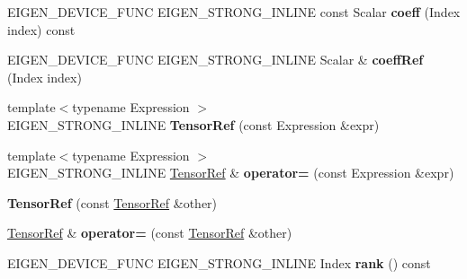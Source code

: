 \begin{DoxyCompactItemize}
\mbox{\label{class_eigen_1_1_tensor_ref_a01da66613cf2600923a71da55a0f3d32}} 
E\+I\+G\+E\+N\+\_\+\+D\+E\+V\+I\+C\+E\+\_\+\+F\+U\+NC E\+I\+G\+E\+N\+\_\+\+S\+T\+R\+O\+N\+G\+\_\+\+I\+N\+L\+I\+NE const Scalar {\bfseries coeff} (Index index) const
\item 
\mbox{\label{class_eigen_1_1_tensor_ref_a326315b6b6d2f3a04ab756b6443f6325}} 
E\+I\+G\+E\+N\+\_\+\+D\+E\+V\+I\+C\+E\+\_\+\+F\+U\+NC E\+I\+G\+E\+N\+\_\+\+S\+T\+R\+O\+N\+G\+\_\+\+I\+N\+L\+I\+NE Scalar \& {\bfseries coeff\+Ref} (Index index)
\item 
\mbox{\label{class_eigen_1_1_tensor_ref_ac14e6162b16cabfd5768e7656d90f805}} 
{\footnotesize template$<$typename Expression $>$ }\\E\+I\+G\+E\+N\+\_\+\+S\+T\+R\+O\+N\+G\+\_\+\+I\+N\+L\+I\+NE {\bfseries Tensor\+Ref} (const Expression \&expr)
\item 
\mbox{\label{class_eigen_1_1_tensor_ref_a3c9b742ec8e3174f749bbb3496ce3567}} 
{\footnotesize template$<$typename Expression $>$ }\\E\+I\+G\+E\+N\+\_\+\+S\+T\+R\+O\+N\+G\+\_\+\+I\+N\+L\+I\+NE \hyperlink{class_eigen_1_1_tensor_ref}{Tensor\+Ref} \& {\bfseries operator=} (const Expression \&expr)
\item 
\mbox{\label{class_eigen_1_1_tensor_ref_a16fc8bd7d36fe78299a14a27f5e5a9ce}} 
{\bfseries Tensor\+Ref} (const \hyperlink{class_eigen_1_1_tensor_ref}{Tensor\+Ref} \&other)
\item 
\mbox{\label{class_eigen_1_1_tensor_ref_a1e1e3403fa4245a05fff49cb58ba40fd}} 
\hyperlink{class_eigen_1_1_tensor_ref}{Tensor\+Ref} \& {\bfseries operator=} (const \hyperlink{class_eigen_1_1_tensor_ref}{Tensor\+Ref} \&other)
\item 
\mbox{\label{class_eigen_1_1_tensor_ref_a6ea330668a912404f71565c87896524c}} 
E\+I\+G\+E\+N\+\_\+\+D\+E\+V\+I\+C\+E\+\_\+\+F\+U\+NC E\+I\+G\+E\+N\+\_\+\+S\+T\+R\+O\+N\+G\+\_\+\+I\+N\+L\+I\+NE Index {\bfseries rank} () const
\item 
\mbox{\label{class_eigen_1_1_tensor_ref_a07a0c6c73c15a973bb84bfc56558da04}} 

\end{DoxyCompactItemize}
